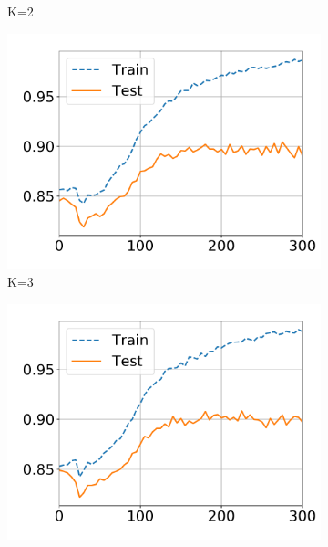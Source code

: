 \begin{figure}[!t]
\begin{subfigure}{.31\textwidth}
    \caption{K=2}
  \end{subfigure}
  \centering
  \begin{subfigure}{.31\textwidth}
    \centering
    \includegraphics[width=1\linewidth]{images/supply/train_curves/satimage_3.pdf}
    \vspace{-0.8cm}
    \caption{K=3}
  \end{subfigure}
  \centering
  \begin{subfigure}{0.31\textwidth}
    \centering
    \includegraphics[width=1\linewidth]{images/supply/train_curves/satimage_4.pdf}
    \vspace{-0.8cm}

\end{subfigure}
\end{figure}

